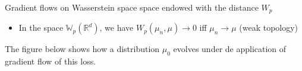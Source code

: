 \documentclass[pdf,aspectratio=169,10pt]{beamer}
\begin{document}
\begin{frame}{ Gradient flows on Wasserstein space}
     space endowed with the distance $W_p$
    \begin{itemize}
        \item In the space $\mathbb{W}_p(\mathbb{R}^d)$, we have $W_p(\mu_n, \mu) \to 0$ iff $\mu_n \to \mu$ (weak topology)
    \end{itemize}
     The figure below shows how a distribution $\mu_0$ evolves under de application of gradient flow of this loss.
    \begin{figure}
        \centering

\end{figure}
\end{frame}
\end{document}
